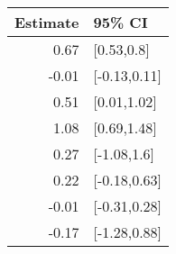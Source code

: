 \begin{tabular}{rl}
  \hline
Estimate & 95\% CI \\ 
  \hline
0.67 & [0.53,0.8] \\ 
  -0.01 & [-0.13,0.11] \\ 
  0.51 & [0.01,1.02] \\ 
  1.08 & [0.69,1.48] \\ 
  0.27 & [-1.08,1.6] \\ 
  0.22 & [-0.18,0.63] \\ 
  -0.01 & [-0.31,0.28] \\ 
  -0.17 & [-1.28,0.88] \\ 
   \hline
\end{tabular}

